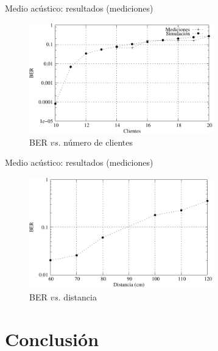 \documentclass[aspectratio=169]{beamer}
\begin{document}
\begin{frame}{Medio acústico: resultados (mediciones)}
  
  \begin{figure}[t]
  \centering  
    \includegraphics[width=8cm]{graphs/medidas_clientes_JIS-fig6}
    \\ BER $vs.$ número de clientes
    \label{ios_process_mem}
\end{figure}

\end{frame}

\begin{frame}{Medio acústico: resultados (mediciones)}
  
\begin{figure}[t]
  \centering  
    \includegraphics[width=8cm]{graphs/mediciones-distancia-fig7}
    \\ BER $vs.$ distancia
    \label{ios_process_mem}
\end{figure}

\end{frame}



\section{Conclusión}
\end{document}
